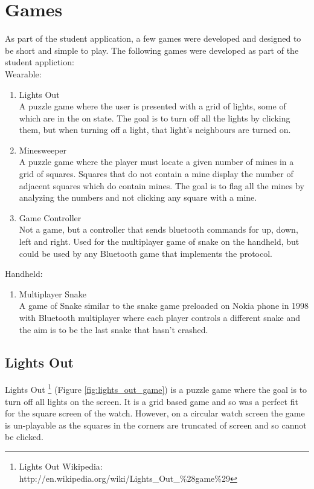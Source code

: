 
\clearpage
\section{Games}

As part of the student application, a few games were developed and designed to
be short and simple to play. The following games were developed as part of the
student appliction:\\
Wearable:
\begin{enumerate}
\item Lights Out\\
    A puzzle game where the user is presented with a grid of lights, some of
    which are in the on state. The goal is to turn off all the lights by
    clicking them, but when turning off a light, that light's neighbours are
    turned on.
\item Minesweeper\\
    A puzzle game where the player must locate a given number of mines in a
    grid of squares. Squares that do not contain a mine display the number of
    adjacent squares which do contain mines. The goal is to flag all the mines
    by analyzing the numbers and not clicking any square with a mine.
\item Game Controller\\
    Not a game, but a controller that sends bluetooth commands for up, down,
    left and right. Used for the multiplayer game of snake on the handheld, but
    could be used by any Bluetooth game that implements the protocol.
\end{enumerate}

Handheld:
\begin{enumerate}
\item Multiplayer Snake\\
    A game of Snake similar to the snake game preloaded on Nokia phone in 1998
    with Bluetooth multiplayer where each player controls a different snake and
    the aim is to be the last snake that hasn't crashed.
\end{enumerate}


\subsection{Lights Out}

Lights Out
\footnote{Lights Out Wikipedia: http://en.wikipedia.org/wiki/Lights\_Out\_\%28game\%29}
(Figure \ref{fig:lights_out_game})
is a puzzle game where the goal is to turn off all lights on the screen. It is
a grid based game and so was a perfect fit for the square screen of the watch.
However, on a circular watch screen the game is un-playable as the squares in
the corners are truncated of screen and so cannot be clicked.

